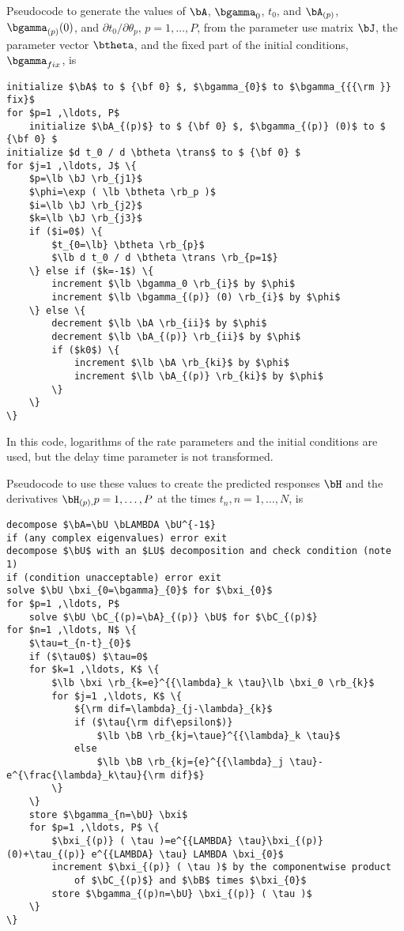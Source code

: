 {Pseudocode to generate the values of $\bA$,
$\bgamma_{0}$,
$t_{0}$,
and
$\bA_{(p)}$,
$\bgamma_{(p)} (0)$, and
$\partial t_0 / \partial \theta_{p}$, $p=1 ,\ldots, P$,
from the parameter use matrix
$\bJ$, the parameter vector $\btheta$, and the fixed part of the
initial conditions, $\bgamma_{{{\rm }} fix}$, is
\begin{verbatim}
initialize $\bA$ to $ {\bf 0} $, $\bgamma_{0}$ to $\bgamma_{{{\rm }} fix}$
for $p=1 ,\ldots, P$
    initialize $\bA_{(p)$} to $ {\bf 0} $, $\bgamma_{(p)} (0)$ to $ {\bf 0} $
initialize $d t_0 / d \btheta \trans$ to $ {\bf 0} $
for $j=1 ,\ldots, J$ \{
    $p=\lb \bJ \rb_{j1}$
    $\phi=\exp ( \lb \btheta \rb_p )$
    $i=\lb \bJ \rb_{j2}$
    $k=\lb \bJ \rb_{j3}$
    if ($i=0$) \{
        $t_{0=\lb} \btheta \rb_{p}$
        $\lb d t_0 / d \btheta \trans \rb_{p=1$}
    \} else if ($k=-1$) \{
        increment $\lb \bgamma_0 \rb_{i}$ by $\phi$
        increment $\lb \bgamma_{(p)} (0) \rb_{i}$ by $\phi$
    \} else \{
        decrement $\lb \bA \rb_{ii}$ by $\phi$
        decrement $\lb \bA_{(p)} \rb_{ii}$ by $\phi$
        if ($k0$) \{
            increment $\lb \bA \rb_{ki}$ by $\phi$
            increment $\lb \bA_{(p)} \rb_{ki}$ by $\phi$
        \}
    \}
\}
\end{verbatim}
In this code, logarithms of the rate parameters and the initial
conditions are used, but the delay time parameter is not transformed.

Pseudocode to use these values to create the predicted responses $\bH$
and the derivatives $\bH_{(p),}p=1 ,\ldots, P$ at the times
$t_n ,n=1 ,\ldots, N$, is
\begin{verbatim}
decompose $\bA=\bU \bLAMBDA \bU^{-1$}
if (any complex eigenvalues) error exit
decompose $\bU$ with an $LU$ decomposition and check condition (note 1)
if (condition unacceptable) error exit
solve $\bU \bxi_{0=\bgamma}_{0}$ for $\bxi_{0}$
for $p=1 ,\ldots, P$
    solve $\bU \bC_{(p)=\bA}_{(p)} \bU$ for $\bC_{(p)$}
for $n=1 ,\ldots, N$ \{
    $\tau=t_{n-t}_{0}$
    if ($\tau0$) $\tau=0$
    for $k=1 ,\ldots, K$ \{
        $\lb \bxi \rb_{k=e}^{{\lambda}_k \tau}\lb \bxi_0 \rb_{k}$
        for $j=1 ,\ldots, K$ \{
            ${\rm dif=\lambda}_{j-\lambda}_{k}$
            if ($\tau{\rm dif\epsilon$)}
                $\lb \bB \rb_{kj=\taue}^{{\lambda}_k \tau}$
            else
                $\lb \bB \rb_{kj={e}^{{\lambda}_j \tau}-e^{\frac{\lambda}_k\tau}{\rm dif}$}
        \}
    \}
    store $\bgamma_{n=\bU} \bxi$
    for $p=1 ,\ldots, P$ \{
        $\bxi_{(p)} ( \tau )=e^{{LAMBDA} \tau}\bxi_{(p)} (0)+\tau_{(p)} e^{{LAMBDA} \tau} LAMBDA \bxi_{0}$
        increment $\bxi_{(p)} ( \tau )$ by the componentwise product
            of $\bC_{(p)$} and $\bB$ times $\bxi_{0}$
        store $\bgamma_{(p)n=\bU} \bxi_{(p)} ( \tau )$
    \}
\}
\end{verbatim}

}
